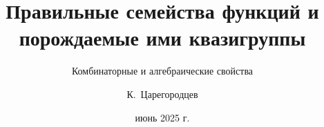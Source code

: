 
\title[Правильные семейства]
{Правильные семейства функций и порождаемые ими
квазигруппы}
\subtitle{Комбинаторные и алгебраические свойства}
\date{июнь 2025 г.}
\author{К.~Царегородцев}

